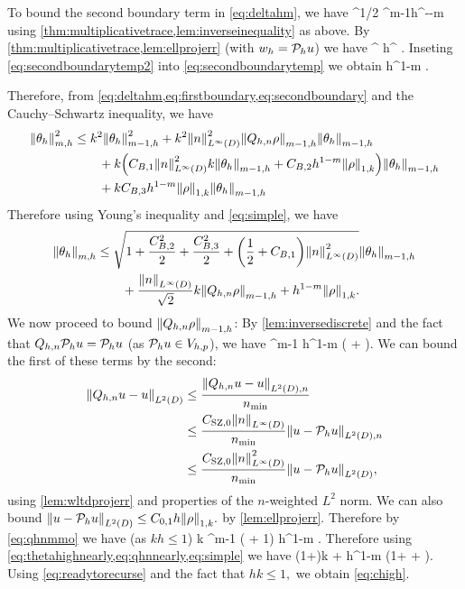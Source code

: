 To bound the second boundary term in \cref{eq:deltahm}, we have
\beq\label{eq:secondboundarytemp}
 \leq \CMT \CinvVhp^{1/2} \Chinv^{m-1}h^{-\half-m}\NLtGI{\rho}
\eeq
using \cref{thm:multiplicativetrace,lem:inverseinequality} as above. By \cref{thm:multiplicativetrace,lem:ellprojerr} (with $w_{h} = \mathcal P_{h} u$) we have
\beq\label{eq:secondboundarytemp2}
\NLtGI{\rho} \leq \CMT {}^{\half} h^{\half} \NW{\rho}.
\eeq
Inseting \cref{eq:secondboundarytemp2} into \cref{eq:secondboundarytemp} we obtain
\beq\label{eq:secondboundary}
 \leq \CBth h^{1-m} \NW{\rho} .
\eeq

Therefore, from \cref{eq:deltahm,eq:firstboundary,eq:secondboundary} and the Cauchy--Schwartz inequality, we have
\begin{align*}
\Nfn{m,h}{\thetah}^2 &\leq k^2 \Nfn{m-1,h}{\thetah}^2 + k^2 \NLiD{n}^2 \Nfn{m-1,h}{\Qhn \rho}\Nfn{m-1,h}{\thetah}\nonumber\\
&\quad\quad+ k\mleft(\CBo \NLiD{n}^2 k\Nfn{m-1,h}{\thetah}+ \CBt h^{1-m} \NW{\rho}\mright)\Nfn{m-1,h}{\thetah}\nonumber\\
&\quad\quad+ k \CBth h^{1-m} \NW{\rho} \Nfn{m-1,h}{\thetah}%
\end{align*}
Therefore using Young's inequality and \cref{eq:simple}, we have
\begin{align}
\Nfn{m,h}{\thetah} &\leq\sqrt{1+\frac{\CBt^2}2 + \frac{\CBth^2}2 + \mleft(\half+\CBo\mright)\NLiD{n}^2}\Nfn{m-1,h}{\thetah}\\
&\quad\quad+ \frac{\NLiD{n}}{\sqrt{2}} k \Nfn{m-1,h}{\Qhn \rho} +  h^{1-m} \NW{\rho}.\label{eq:thetahighnearly}
\end{align}
We now proceed to bound $\Nfn{m-1,h}{\Qhn \rho}$: By \cref{lem:inversediscrete} and the fact that $Q_{h,n} \mathcal P_{h} u = \mathcal P_{h} u$ (as $\mathcal P_{h} u \in V_{h,p}$), we have
\beq\label{eq:qhnmmo}
 \leq \Chinv^{m-1} h^{1-m} \mleft( + \mright).
\eeq
We can bound the first of these terms by the second:
\begin{align*}
\NLtD{\Qhn u - u} &\leq \frac{\NLtDn{\Qhn u - u}}{\nmin}\\
&\leq \frac{\CSZfn{0} \NLiD{n}}{\nmin} \NLtDn{u - \Ph u}\\
&\leq \frac{\CSZfn{0}\NLiD{n}^2}{\nmin} \NLtD{u-\Ph u},
\end{align*}
using \cref{lem:wltdprojerr} and properties of the $n$-weighted $L^2$ norm. We can also bound $\NLtD{u - \Ph u} \leq \Cfn{0,1} h \NW{\rho}.$ by \cref{lem:ellprojerr}. Therefore by \cref{eq:qhnmmo} we have (as $kh \leq 1$)
\beq\label{eq:qhnnearly}
k  \leq \Chinv^{m-1} \mleft( + 1\mright)  h^{1-m} \NW{\rho}.
\eeq
Therefore using \cref{eq:thetahighnearly,eq:qhnnearly,eq:simple} we have
\beq\label{eq:readytorecurse}
 \leq \CReco \mleft(1+\mright)k  + \CRect h^{1-m} \mleft(1+ + \mright)\NW{\rho}.
\eeq
Using \cref{eq:readytorecurse} and the fact that $hk \leq 1,$ we obtain \cref{eq:chigh}.
\epf

